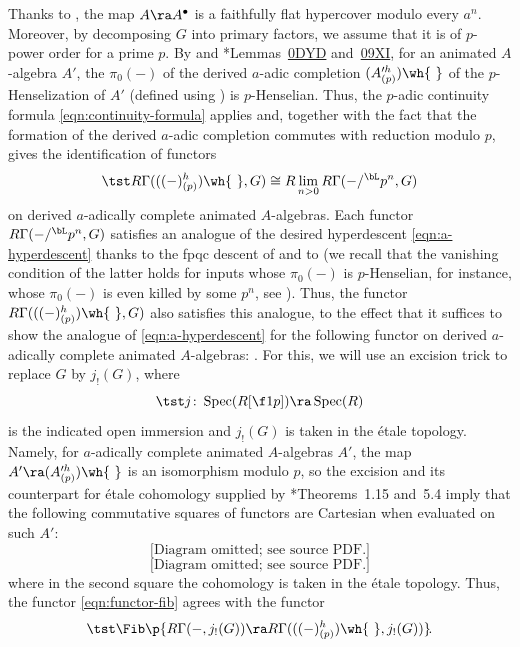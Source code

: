 \bpf
Thanks to , the map $A \ra A^\bullet$ is a faithfully flat hypercover modulo every $a^n$. Moreover, by decomposing $G$ into primary factors, we assume that it is of $p$-power order for a prime $p$. By  and \cite{SP}*{Lemmas~\href{https://stacks.math.columbia.edu/tag/0DYD}{0DYD} and~\href{https://stacks.math.columbia.edu/tag/09XI}{09XI}}, for an animated $A$-algebra $A'$, the $\pi_0(-)$ of the derived $a$-adic completion $(A'^h_{(p)})\wh{\ }$ of the $p$-Henselization of $A'$ (defined using ) is $p$-Henselian. Thus, the $p$-adic continuity formula \eqref{eqn:continuity-formula} applies and, together with the fact that the formation of the derived $a$-adic completion commutes with reduction modulo $p$, gives the identification of functors
\[
\tst R\Gamma(((-)^h_{(p)})\wh{\ }, G) \cong R\lim_{n > 0} R\Gamma(-/^\bL p^n, G)
\]
on derived $a$-adically complete animated $A$-algebras. Each functor $R\Gamma(-/^\bL p^n, G)$ satisfies an analogue of the desired hyperdescent \eqref{eqn:a-hyperdescent} thanks to the fpqc descent of  and to  (we recall that the vanishing condition of the latter holds for inputs whose $\pi_0(-)$ is $p$-Henselian, for instance, whose $\pi_0(-)$ is even killed by some $p^n$, see ). Thus, the functor $R\Gamma(((-)^h_{(p)})\wh{\ }, G)$ also satisfies this analogue, to the effect that it suffices to show  the analogue of \eqref{eqn:a-hyperdescent} for the following functor on derived $a$-adically complete animated $A$-algebras:
\be \label{eqn:functor-fib}
\Fib{}\!.
\ee
For this, we will use an excision trick to replace $G$ by $j_!(G)$, where
\[
\tst j \colon \Spec(R[\f 1p]) \ra \Spec(R)
\]
is the indicated open immersion and $j_!(G)$ is taken in the \'{e}tale topology. Namely, for $a$-adically complete animated $A$-algebras $A'$, the map $A' \ra (A'^h_{(p)})\wh{\ }$ is an isomorphism modulo $p$, so the excision  and its counterpart for \'{e}tale cohomology supplied by \cite{BM20}*{Theorems~1.15 and~5.4} imply that the following commutative squares of functors are Cartesian when evaluated on such $A'$:
\[
\text{[Diagram omitted; see source PDF.]}
\]
\[
\text{[Diagram omitted; see source PDF.]}
\]
where in the second square the cohomology is taken in the \'{e}tale topology. Thus, the functor \eqref{eqn:functor-fib} agrees with the functor
\[
\tst \Fib\p{R\Gamma(-, j_!(G)) \ra R\Gamma(((-)^h_{(p)})\wh{\ }, j_!(G)) }\!.
\]

